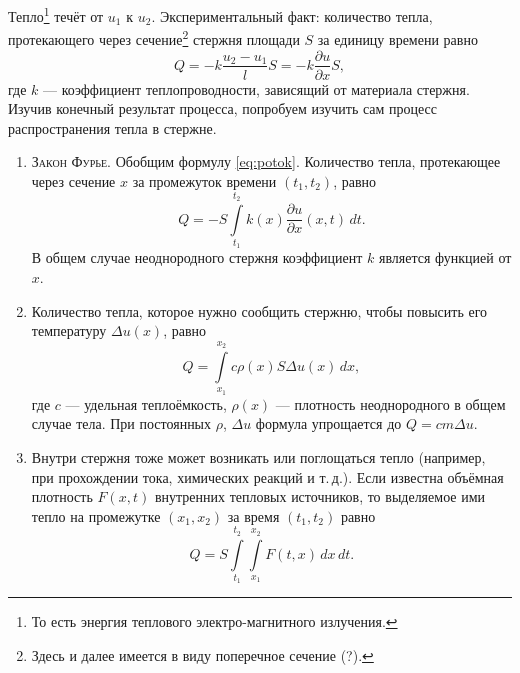 Тепло\footnote{То есть энергия теплового электро-магнитного излучения.} течёт от $ u_1 $ к $ u_2 $. Экспериментальный факт: количество тепла,
протекающего через сечение\footnote{Здесь и далее имеется в виду поперечное
сечение (?).} стержня площади $ S $ за единицу времени равно 
\begin{equation}
  \label{eq:potok}
  Q = -k \frac{u_2 - u_1}{l} S = -k \frac{\partial u}{\partial x}S,
\end{equation}
где $ k $ --- коэффициент теплопроводности, зависящий от материала
стержня. Изучив конечный результат процесса, попробуем изучить сам процесс
распространения тепла в стержне.
\begin{enumerate}
  \item \textsc{Закон Фурье.} Обобщим формулу \eqref{eq:potok}. Количество
    тепла, протекающее через сечение $ x $ за промежуток
времени $ (t_1, t_2) $, равно 
\begin{equation}
  \label{eq:fourier}
  Q = -S\int\limits_{t_1}^{t_2}k(x) \frac{\partial u}{\partial x}(x, t)\,dt.
\end{equation}
В общем случае неоднородного стержня
коэффициент $ k $ является функцией от $ x $. 
\item Количество тепла, которое нужно сообщить стержню, чтобы повысить его
  температуру $ \Delta u(x) $, равно  
  \begin{equation}
    \label{eq:2}
    Q =\int\limits_{x_1}^{x_2} c\rho(x) S\Delta u(x)\,dx,
  \end{equation}
  где $ c $ --- удельная теплоёмкость, $ \rho(x) $ --- плотность неоднородного в
  общем случае тела. При постоянных $ \rho $, $ \Delta u $ формула упрощается до
  $ Q = cm\Delta u $.
\item Внутри стержня тоже может возникать или поглощаться тепло (например, при
  прохождении тока, химических реакций и т.\,д.). Если известна объёмная
  плотность $ F(x, t) $ внутренних тепловых источников, то выделяемое ими тепло
  на промежутке $ (x_1, x_2) $ за время $ (t_1, t_2) $
  равно 
  \begin{equation}
    \label{eq:F}
    Q = S\int\limits_{t_1}^{t_2}\int\limits_{x_1}^{x_2}F(t, x)\,dx\,dt.
  \end{equation}
\end{enumerate}
  
